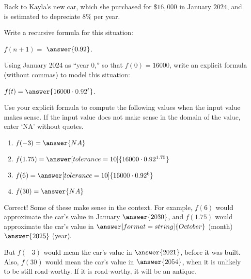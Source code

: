 \documentclass[nooutcomes]{ximera}
\begin{document}
\begin{problem}
Back to Kayla's new car, which she purchased for $\$16,\!000$ in January $2024$, and is estimated to depreciate $8\%$ per year.  

Write a recursive formula for this situation:  

\begin{prompt}
$f(n+1) =$ 
\wordChoice{\choice{$+$}\choice{$-$}\choice[correct]{$\times$}\choice{$\div$}\choice{$\wedge$}}$\answer{0.92}$.
\end{prompt}
\begin{problem}
Using January 2024 as ``year 0,'' so that $f(0)=16000$,  write an explicit formula (without commas) to model this situation: 
\begin{prompt}
$f(t) = \answer{16000\cdot 0.92^t}$.
\end{prompt}

\begin{problem}
Use your explicit formula to compute the following values when the input value makes sense.  If the input value does not make sense in the domain of the value, enter `NA' without quotes.
\begin{enumerate}
\item $f(-3) = \answer{NA}$
\item $f(1.75) = \answer[tolerance=10]{16000\cdot 0.92^{1.75}}$
\item $f(6) = \answer[tolerance=10]{16000\cdot 0.92^6}$
\item $f(30) = \answer{NA}$
\end{enumerate}
\begin{problem}
Correct!  Some of these make sense in the context.  For example, $f(6)$ would approximate the car's value in January $\answer{2030}$, and $f(1.75)$ would approximate the car's value in $\answer[format=string]{October}$ (month) $\answer{2025}$ (year).  

But $f(-3)$ would mean the car's value in $\answer{2021}$, before it was built.  Also, $f(30)$ would mean the car's value in $\answer{2054}$, when it is unlikely to be still road-worthy.  If it is road-worthy, it will be an antique.    

\end{problem}

\end{problem}
\end{problem}
\end{problem}
\end{document}
